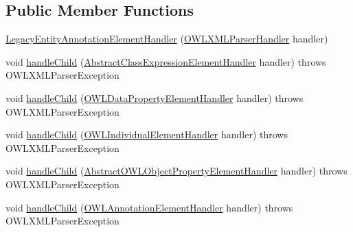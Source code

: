 \subsection*{Public Member Functions}
\begin{DoxyCompactItemize}
\item 
\hyperlink{classorg_1_1coode_1_1owlapi_1_1owlxmlparser_1_1_legacy_entity_annotation_element_handler_aa3177a418f3db7d6197809db9aa66644}{Legacy\-Entity\-Annotation\-Element\-Handler} (\hyperlink{classorg_1_1coode_1_1owlapi_1_1owlxmlparser_1_1_o_w_l_x_m_l_parser_handler}{O\-W\-L\-X\-M\-L\-Parser\-Handler} handler)
\item 
void \hyperlink{classorg_1_1coode_1_1owlapi_1_1owlxmlparser_1_1_legacy_entity_annotation_element_handler_a5443bf0e8ffe1e244668ccdf59dbe4cc}{handle\-Child} (\hyperlink{classorg_1_1coode_1_1owlapi_1_1owlxmlparser_1_1_abstract_class_expression_element_handler}{Abstract\-Class\-Expression\-Element\-Handler} handler)  throws O\-W\-L\-X\-M\-L\-Parser\-Exception 
\item 
void \hyperlink{classorg_1_1coode_1_1owlapi_1_1owlxmlparser_1_1_legacy_entity_annotation_element_handler_a7c2eb55b136941bb9eae8761e7bbebd0}{handle\-Child} (\hyperlink{classorg_1_1coode_1_1owlapi_1_1owlxmlparser_1_1_o_w_l_data_property_element_handler}{O\-W\-L\-Data\-Property\-Element\-Handler} handler)  throws O\-W\-L\-X\-M\-L\-Parser\-Exception 
\item 
void \hyperlink{classorg_1_1coode_1_1owlapi_1_1owlxmlparser_1_1_legacy_entity_annotation_element_handler_ad9f8df1d5f83ea0c04ef35cf9bee9525}{handle\-Child} (\hyperlink{classorg_1_1coode_1_1owlapi_1_1owlxmlparser_1_1_o_w_l_individual_element_handler}{O\-W\-L\-Individual\-Element\-Handler} handler)  throws O\-W\-L\-X\-M\-L\-Parser\-Exception 
\item 
void \hyperlink{classorg_1_1coode_1_1owlapi_1_1owlxmlparser_1_1_legacy_entity_annotation_element_handler_ae3bc1d244f96a5b90b7f54710a2b2cf3}{handle\-Child} (\hyperlink{classorg_1_1coode_1_1owlapi_1_1owlxmlparser_1_1_abstract_o_w_l_object_property_element_handler}{Abstract\-O\-W\-L\-Object\-Property\-Element\-Handler} handler)  throws O\-W\-L\-X\-M\-L\-Parser\-Exception 
\item 
void \hyperlink{classorg_1_1coode_1_1owlapi_1_1owlxmlparser_1_1_legacy_entity_annotation_element_handler_afa80b7a65ff0a1549cf1835b42a6d5e0}{handle\-Child} (\hyperlink{classorg_1_1coode_1_1owlapi_1_1owlxmlparser_1_1_o_w_l_annotation_element_handler}{O\-W\-L\-Annotation\-Element\-Handler} handler)  throws O\-W\-L\-X\-M\-L\-Parser\-Exception 
\end{DoxyCompactItemize}
